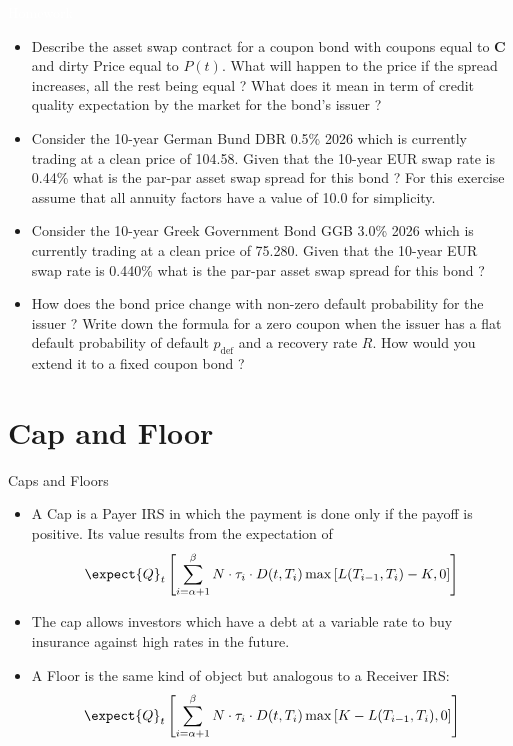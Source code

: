 \documentclass{beamer}
\begin{document}
\begin{homework}
\begin{frame}{\textcolor{white}{Homework}}
\begin{itemize}
	\item[white] Describe the asset swap contract for a coupon bond with coupons equal to \textbf{C} and dirty Price equal to $P(t)$. What will happen to the price if the spread increases, all the rest being equal ? What does it mean in term of credit quality expectation by the market for the bond's issuer ?
	\item[white]  Consider the 10-year German Bund DBR 0.5\% 2026 which is currently trading at a clean price of 104.58.
	Given that the 10-year EUR swap rate is 0.44\% what is the par-par asset swap spread for this bond ?
	For this exercise assume that all annuity factors have a value of 10.0 for simplicity.
	\item[white] Consider the 10-year Greek Government Bond GGB 3.0\% 2026 which is currently trading at a clean price of 75.280. Given that the 10-year EUR swap rate is 0.440\% what is the par-par asset swap spread for this bond ?
	\item[white] How does the bond price change with non-zero default probability for the issuer ? Write down the formula for a zero coupon when the issuer has a flat default probability of default $p_{\text{def}}$ and a recovery rate $R$.
	How would you extend it to a fixed coupon bond ?
\end{itemize}
\end{frame}
\end{homework}

\section{Cap and Floor}
\begin{frame}{Caps and Floors}
	\begin{itemize}
		\item<1-> A \textcolor{maincolor}{Cap} is a Payer IRS in which the payment is done \textcolor{maincolor}{only} if the payoff is positive. Its value results from the expectation of
		\begin{equation}
			\expect{Q}_t \left[\sum_{i=\alpha+1}^{\beta}N\cdot\tau_i\cdot D(t,T_i)\max\left[L(T_{i-1},T_i)-K,0\right]\right]
			\label{eq:cap}
		\end{equation}
		\item<2-> The cap allows investors which have a debt at a variable rate to buy insurance against high rates in the future.
		\item<3-> A \textcolor{maincolor}{Floor} is the same kind of object but analogous to a Receiver IRS:
		\begin{equation}
				\expect{Q}_t \left[\sum_{i=\alpha+1}^{\beta} N\cdot\tau_i\cdot D(t,T_i)\max\left[K-L(T_{i-1},T_i),0\right]\right]
			\label{eq:floor}
		\end{equation}
	\end{itemize}
\end{frame}
\end{document}
